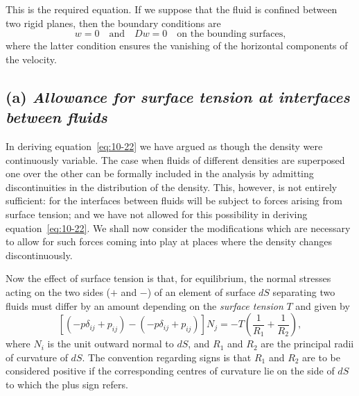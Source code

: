 This is the required equation. If we suppose that the fluid is confined between two rigid planes, then the boundary conditions are
\begin{equation}
\label{eq:10-23}
w = 0 \quad\text{and}\quad Dw = 0 \quad\text{on the bounding surfaces,}
\end{equation}
where the latter condition ensures the vanishing of the horizontal components of the velocity.

\subsection*{(a) \textit{Allowance for surface tension at interfaces between fluids}}

In deriving equation~\eqref{eq:10-22} we have argued as though the density were continuously variable. The case when fluids of different densities are superposed one over the other can be formally included in the analysis by admitting discontinuities in the distribution of the density. This, however, is not entirely sufficient: for the interfaces between fluids will be subject to forces arising from surface tension; and we have not allowed for this possibility in deriving equation~\eqref{eq:10-22}. We shall now consider the modifications which are necessary to allow for such forces coming into play at places where the density changes discontinuously.

Now the effect of surface tension is that, for equilibrium, the normal stresses acting on the two sides ($+$ and $-$) of an element of surface $dS$ separating two fluids must differ by an amount depending on the \emph{surface tension} $T$ and given by
\begin{equation}
\label{eq:10-24}
[(-p\delta_{ij}+p_{ij})-(-p\delta_{ij}+p_{ij})]N_j = -T\!\left(\frac{1}{R_1}+\frac{1}{R_2}\right)\!,
\end{equation}
where $N_i$ is the unit outward normal to $dS$, and $R_1$ and $R_2$ are the principal radii of curvature of $dS$. The convention regarding signs is that $R_1$ and $R_2$ are to be considered positive if the corresponding centres of curvature lie on the side of $dS$ to which the plus sign refers.

